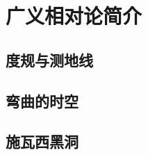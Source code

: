 

\section{广义相对论简介}\label{28-4}

\subsection{度规与测地线}\label{28-4-1}

\subsection{弯曲的时空}\label{28-4-2}

\subsection{施瓦西黑洞}\label{28-4-3}